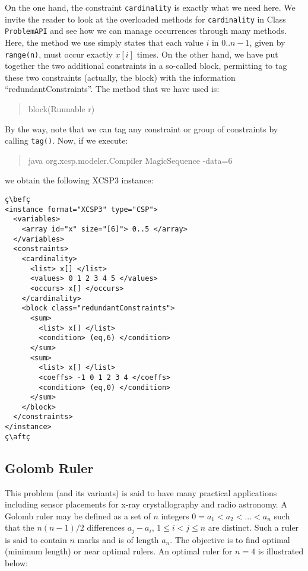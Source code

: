 \documentclass[10pt]{article}
\def\xt{{\rm XCSP3}\xspace}
\newcommand{\gb}[1]{{\tt #1}} %
\newcommand{\nn}[1]{{\tt #1}} %
\def\xt{{\rm XCSP3}\xspace}
\newenvironment{myvb}{\endgraf\small\verbatim}{\endverbatim}
\def\bef{\rule{10cm}{0.1mm}} %
\def\aft{\rule{10cm}{0.1mm}\medskip}
\begin{document}
On the one hand, the constraint \gb{cardinality} is exactly what we need here.
We invite the reader to look at the overloaded methods for \gb{cardinality} in Class \nn{ProblemAPI} and see how we can manage occurrences through many methods.
Here, the method we use simply states that each value $i$ in $0..n-1$, given by \verb!range(n)!, must occur exactly $x[i]$ times. 
On the other hand, we have put together the two additional constraints in a so-called block, permitting to tag these two constraints (actually, the block) with the information ``redundantConstraints''.
The method that we have used is:

\begin{quote}
\begin{myvb}
block(Runnable r) 
\end{myvb}
\end{quote}

By the way, note that we can tag any constraint or group of constraints by calling \nn{tag()}.
Now, if we execute:
\begin{quote}
\begin{myvb}
java org.xcsp.modeler.Compiler MagicSequence -data=6
\end{myvb}
\end{quote}
we obtain the following \xt instance:
\begin{lstlisting}
ç\befç
<instance format="XCSP3" type="CSP">
  <variables>
    <array id="x" size="[6]"> 0..5 </array>
  </variables>
  <constraints>
    <cardinality>
      <list> x[] </list>
      <values> 0 1 2 3 4 5 </values>
      <occurs> x[] </occurs>
    </cardinality>
    <block class="redundantConstraints">
      <sum>
        <list> x[] </list>
        <condition> (eq,6) </condition>
      </sum>
      <sum>
        <list> x[] </list>
        <coeffs> -1 0 1 2 3 4 </coeffs>
        <condition> (eq,0) </condition>
      </sum>
    </block>
  </constraints>
</instance>
ç\aftç
\end{lstlisting}

\subsection{Golomb Ruler}

This problem (and its variants) is said to have many practical applications including sensor placements for x-ray crystallography and radio astronomy. 
A Golomb ruler may be defined as a set of $n$ integers $0 = a_1 < a_2 < ... < a_n$ such that the $n(n-1)/2$ differences $a_j - a_i$, $1 \leq i < j \leq n$ are distinct. 
Such a ruler is said to contain $n$ marks and is of length $a_n$. 
The objective is to find optimal (minimum length) or near optimal rulers. 
An optimal ruler for $n=4$ is illustrated below:
\end{document}
